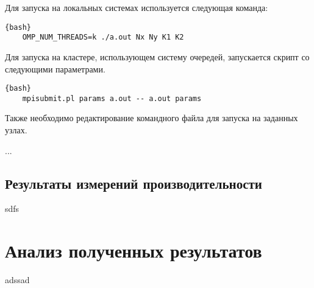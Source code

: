 \documentclass[12pt, a4paper]{article}
\begin{document}
Для запуска на локальных системах используется следующая команда:

\begin{lstlisting}{bash}
	OMP_NUM_THREADS=k ./a.out Nx Ny K1 K2
\end{lstlisting}

Для запуска на кластере, использующем систему очередей, запускается скрипт со следующими параметрами.

\begin{lstlisting}{bash}
	mpisubmit.pl params a.out -- a.out params
\end{lstlisting}

Также необходимо редактирование командного файла для запуска на заданных узлах.

...


\subsection{Результаты измерений производительности}

sdfs

\newpage

\section{Анализ полученных результатов}

adssad
\end{document}
